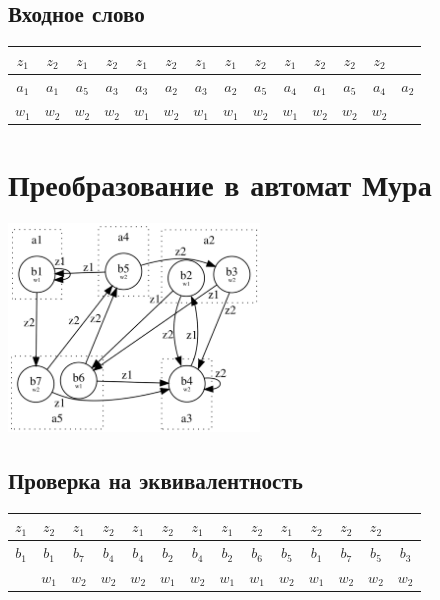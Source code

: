 \documentclass[listings]{labreport}
\begin{document}
\subsection*{Входное слово}

\begin{tabular}{|c|c|c|c|c|c|c|c|c|c|c|c|c|c|}
\hline
$z_1$ & $z_2$ & $z_1$ & $z_2$ & $z_1$ & $z_2$ & $z_1$ & $z_1$ & $z_2$ & $z_1$ & $z_2$ & $z_2$ & $z_2$ & \\\hline

$a_1$ & $a_1$ & $a_5$ & $a_3$ & $a_3$ & $a_2$ & $a_3$ & $a_2$ & $a_5$ & $a_4$ & $a_1$ & $a_5$ & $a_4$ & $a_2$ \\\hline

$w_1$ & $w_2$ & $w_2$ & $w_2$ & $w_1$ & $w_2$ & $w_1$ & $w_1$ & $w_2$ & $w_1$ & $w_2$ & $w_2$ & $w_2$ & \\\hline
\end{tabular}

\newpage

\section*{Преобразование в автомат Мура}

\includegraphics[width=0.5\textwidth]{moore.png}

\subsection*{Проверка на эквивалентность}

\begin{tabular}{|c|c|c|c|c|c|c|c|c|c|c|c|c|c|}
\hline
$z_1$ & $z_2$ & $z_1$ & $z_2$ & $z_1$ & $z_2$ & $z_1$ & $z_1$ & $z_2$ & $z_1$ & $z_2$ & $z_2$ & $z_2$ & \\\hline

$b_1$ & $b_1$ & $b_7$ & $b_4$ & $b_4$ & $b_2$ & $b_4$ & $b_2$ & $b_6$ & $b_5$ & $b_1$ & $b_7$ & $b_5$ & $b_3$ \\\hline

      & $w_1$ & $w_2$ & $w_2$ & $w_2$ & $w_1$ & $w_2$ & $w_1$ & $w_1$ & $w_2$ & $w_1$ & $w_2$ & $w_2$ & $w_2$ \\\hline
\end{tabular}
\end{document}
